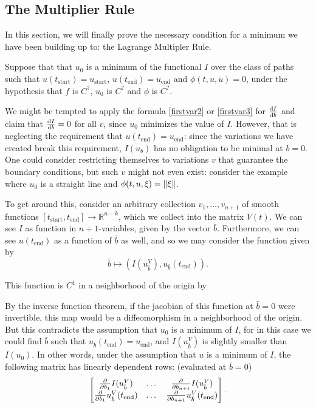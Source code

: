 \documentclass{article}
\theoremstyle{plain}
\theoremstyle{plain}
\theoremstyle{nonumberplain}
\theoremstyle{empty}
\newcommand{\R}{\mathbb{R}}
\newcommand{\tstart}{\mathrm{start}}
\newcommand{\tend}{\mathrm{end}}
\DeclarePairedDelimiter\norm{\lVert}{\rVert}
\newcommand{\vecb}{{\bar{b}}}
\begin{document}
\subsection{The Multiplier Rule}\label{sec:multrule}

In this section, we will finally prove the necessary condition for a minimum we have been building up to: the Lagrange Multipler Rule.

Suppose that that $u_0$ is a minimum of the functional $I$ over the class of paths such that $u(t_\tstart) = u_\tstart$, $u(t_\tend) = u_\tend$ and $\phi(t,u,\dot u) = 0$, under the hypothesis that $f$ is $C^?$, $u_0$ is $C^?$ and $\phi$ is $C^?$.

We might be tempted to apply the formula \eqref{firstvar2} or \eqref{firstvar3} for $\diff I b$ and claim that $\diff I b = 0$ for all $v$, since $u_0$ minimizes the value of $I$. However, that is neglecting the requirement that $u(t_\tend) = u_\tend$: since the variations we have created break this requirement, $I(u_b)$ has no obligation to be minimal at $b = 0$. One could consider restricting themselves to variations $v$ that guarantee the boundary conditions, but such $v$ might not even exist: consider the example where $u_0$ is a straight line and $\phi(t,u,\xi) = \norm \xi$.

To get around this, consider an arbitrary collection $v_1, \dots, v_{n+1}$ of smooth functions $[t_\tstart, t_\tend] \to \R^{n-k}$, which we collect into the matrix $V(t)$. We can see $I$ as function in $n+1$-variables, given by the vector $\vecb$. Furthermore, we can see $u(t_\tend)$ as a function of $\vecb$ as well, and so we may consider the function given by
\[\vecb \mapsto (I(u_\vecb^V), u_\vecb(t_\tend)).\]

This function is $C^1$ in a neighborhood of the origin by 

By the inverse function theorem, if the jacobian of this function at $\vecb = 0$ were invertible, this map would be a diffeomorphism in a neighborhood of the origin. But this contradicts the assumption that $u_0$ is a minimum of $I$, for in this case we could find $\vecb$ such that $u_\vecb(t_\tend) = u_\tend$, and $I(u_\vecb^V)$ is slightly smaller than $I(u_0)$. In other words, under the assumption that $u$ is a minimum of $I$, the following matrix has linearly dependent rows: (evaluated at $\vecb = 0$)
\[
\begin{bmatrix}
\diffp*{I(u_\vecb^V)}{b_1} & \dots & \diffp*{I(u_\vecb^V)}{b_{n+1}}\\
\diffp*{u_\vecb^V(t_\tend)}{b_1} & \dots &\diffp*{u_\vecb^V(t_\tend)}{b_{n+1}}
\end{bmatrix}.
\]
\end{document}
